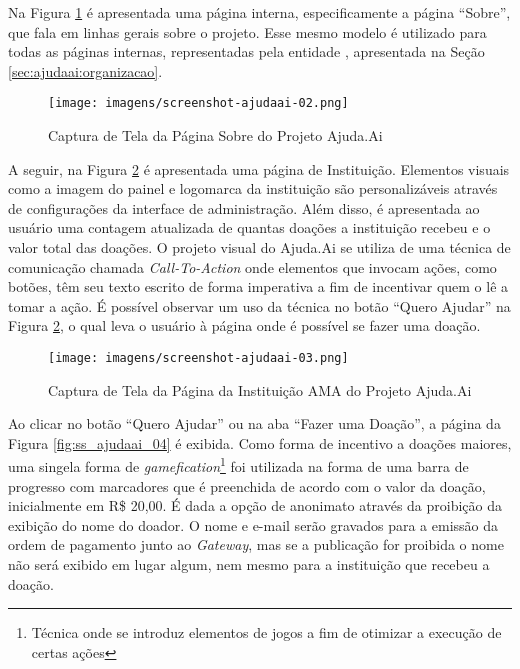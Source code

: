 Na Figura \ref{fig:ss_ajudaai_02} é apresentada uma página interna, especificamente a página ``Sobre'', que fala em linhas gerais sobre o projeto. Esse mesmo modelo é utilizado para todas as páginas internas, representadas pela entidade , apresentada na Seção \ref{sec:ajudaai:organizacao}.

\begin{figure}[H]
	\caption{\label{fig:ss_ajudaai_02}Captura de Tela da Página Sobre do Projeto Ajuda.Ai}
    \centering
    \texttt{[image: imagens/screenshot-ajudaai-02.png]}
\end{figure}

A seguir, na Figura \ref{fig:ss_ajudaai_03} é apresentada uma página de Instituição. Elementos visuais como a imagem do painel e logomarca da instituição são personalizáveis através de configurações da interface de administração. Além disso, é apresentada ao usuário uma contagem atualizada de quantas doações a instituição recebeu e o valor total das doações. O projeto visual do Ajuda.Ai se utiliza de uma técnica de comunicação chamada \emph{Call-To-Action}\cite{wiki:CallToAction} onde elementos que invocam ações, como botões, têm seu texto escrito de forma imperativa a fim de incentivar quem o lê a tomar a ação. É possível observar um uso da técnica no botão ``Quero Ajudar'' na Figura \ref{fig:ss_ajudaai_03}, o qual leva o usuário à página onde é possível se fazer uma doação.

\begin{figure}[H]
	\caption{\label{fig:ss_ajudaai_03}Captura de Tela da Página da Instituição AMA do Projeto Ajuda.Ai}
    \centering
    \texttt{[image: imagens/screenshot-ajudaai-03.png]}
\end{figure}

Ao clicar no botão ``Quero Ajudar'' ou na aba ``Fazer uma Doação'', a página da Figura \ref{fig:ss_ajudaai_04} é exibida. Como forma de incentivo a doações maiores, uma singela forma de \emph{gamefication}\footnote{Técnica onde se introduz elementos de jogos a fim de otimizar a execução de certas ações} foi utilizada na forma de uma barra de progresso com marcadores que é preenchida de acordo com o valor da doação, inicialmente em R\$ 20,00. É dada a opção de anonimato através da proibição da exibição do nome do doador. O nome e e-mail serão gravados para a emissão da ordem de pagamento junto ao \emph{Gateway}, mas se a publicação for proibida o nome não será exibido em lugar algum, nem mesmo para a instituição que recebeu a doação.

